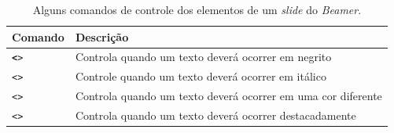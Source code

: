 \begin{table}[H]
\centering
\caption{Alguns comandos de controle dos elementos de um \textit{slide} do \textit{Beamer}.}
\label{tab:beamer1}
    \begin{tabular}{p{3cm}p{8cm}}
    \toprule
    \textbf{Comando} & \textbf{Descrição} \\
    \midrule
    \texttt{\textbf<>{}} & Controla quando um texto deverá ocorrer em negrito \\
    \texttt{\textit<>{}} & Controle quando um texto deverá ocorrer em itálico \\
    \texttt{\color<>{}} & Controla quando um texto deverá ocorrer em uma cor diferente \\
    \texttt{\alert<>{}} & Controla quando um texto deverá ocorrer destacadamente \\
    \bottomrule
    \end{tabular}
\end{table}






